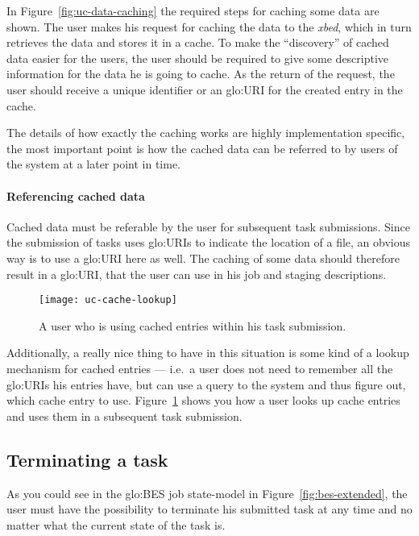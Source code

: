In  Figure~\ref{fig:uc-data-caching} the required  steps for  caching some
data are  shown. The user  makes his request  for caching the data  to the
\emph{xbed}, which in turn retrieves the data and stores it in a cache. To
make  the ``discovery''  of cached  data easier  for the  users,  the user
should be required to give some descriptive information for the data he is
going to  cache. As the return of  the request, the user  should receive a
unique identifier or an \gls{glo:URI} for the created entry in the cache.

The details  of how  exactly the caching  works are  highly implementation
specific, the most important point is  how the cached data can be referred
to by users of the system at a later point in time.

\paragraph{Referencing cached  data}

Cached data must be referable by the user for subsequent task submissions.
Since the submission of tasks uses \gls{glo:URI}s to indicate the location
of a  file, an obvious  way is  to use a  \gls{glo:URI} here as  well. The
caching of some data should  therefore result in a \gls{glo:URI}, that the
user can use in his job and staging descriptions.

\begin{figure}[h]
  \centering
  \texttt{[image: uc-cache-lookup]}
  \caption[UC  Cache Lookup]{A user  who  is using cached entries within
    his task submission.}
  \label{fig:uc-cache-lookup}
\end{figure}

Additionally, a really  nice thing to have in this  situation is some kind
of a lookup mechanism for cached  entries --- i.e.~a user does not need to
remember all the  \gls{glo:URI}s his entries have, but can  use a query to
the    system   and   thus    figure   out,    which   cache    entry   to
use. Figure~\ref{fig:uc-cache-lookup} shows you  how a user looks up cache
entries and uses them in a subsequent task submission.

\subsection{Terminating a task}
\label{sec:uc-terminate-task}

As   you   could   see   in   the   \gls{glo:BES}   job   state-model   in
Figure~\ref{fig:bes-extended},  the  user  must  have the  possibility  to
terminate his  submitted task at any  time and no matter  what the current
state of the task is.

